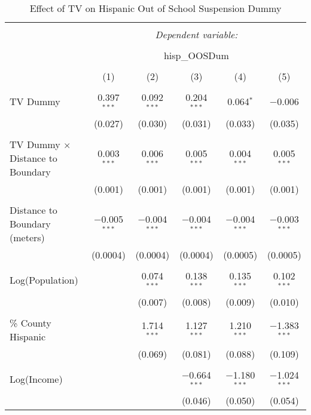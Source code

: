 
\begin{table}[!htbp] \centering 
  \caption{Effect of TV on Hispanic Out of School Suspension Dummy} 
  \label{} 
\begin{tabular}{@{\extracolsep{-2pt}}lccccc} 
\\[-1.8ex]\hline 
\hline \\[-1.8ex] 
 & \multicolumn{5}{c}{\textit{Dependent variable:}} \\ 
\cline{2-6} 
\\[-1.8ex] & \multicolumn{5}{c}{hisp\_OOSDum} \\ 
\\[-1.8ex] & (1) & (2) & (3) & (4) & (5)\\ 
\hline \\[-1.8ex] 
 TV Dummy & 0.397$^{***}$ & 0.092$^{***}$ & 0.204$^{***}$ & 0.064$^{*}$ & $-$0.006 \\ 
  & (0.027) & (0.030) & (0.031) & (0.033) & (0.035) \\ 
  & & & & & \\ 
 TV Dummy $\times$ Distance to Boundary & 0.003$^{***}$ & 0.006$^{***}$ & 0.005$^{***}$ & 0.004$^{***}$ & 0.005$^{***}$ \\ 
  & (0.001) & (0.001) & (0.001) & (0.001) & (0.001) \\ 
  & & & & & \\ 
 Distance to Boundary (meters) & $-$0.005$^{***}$ & $-$0.004$^{***}$ & $-$0.004$^{***}$ & $-$0.004$^{***}$ & $-$0.003$^{***}$ \\ 
  & (0.0004) & (0.0004) & (0.0004) & (0.0005) & (0.0005) \\ 
  & & & & & \\ 
 Log(Population) &  & 0.074$^{***}$ & 0.138$^{***}$ & 0.135$^{***}$ & 0.102$^{***}$ \\ 
  &  & (0.007) & (0.008) & (0.009) & (0.010) \\ 
  & & & & & \\ 
 \% County Hispanic &  & 1.714$^{***}$ & 1.127$^{***}$ & 1.210$^{***}$ & $-$1.383$^{***}$ \\ 
  &  & (0.069) & (0.081) & (0.088) & (0.109) \\ 
  & & & & & \\ 
 Log(Income) &  &  & $-$0.664$^{***}$ & $-$1.180$^{***}$ & $-$1.024$^{***}$ \\ 
  &  &  & (0.046) & (0.050) & (0.054) \\ 

\end{tabular}
\end{table}
